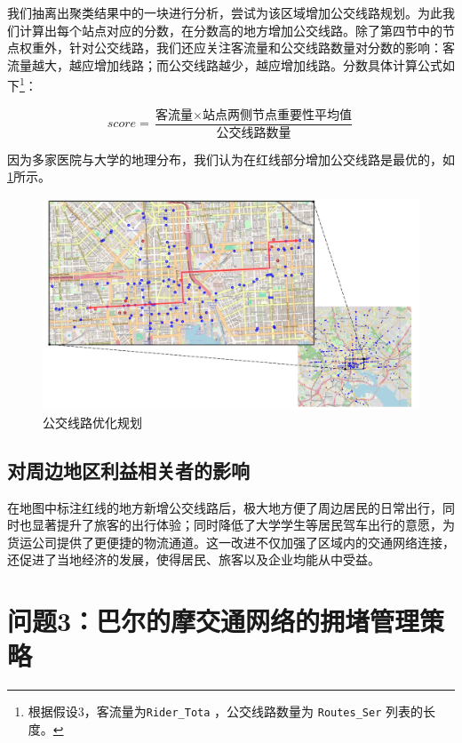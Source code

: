 \documentclass[12pt, a4paper, oneside]{ctexart}
\begin{document}
我们抽离出聚类结果中的一块进行分析，尝试为该区域增加公交线路规划。为此我们计算出每个站点对应的分数，在分数高的地方增加公交线路。除了第四节中的节点权重外，针对公交线路，我们还应关注客流量和公交线路数量对分数的影响：客流量越大，越应增加线路；而公交线路越少，越应增加线路。分数具体计算公式如下\footnote{根据假设3，客流量为\texttt{Rider\_Tota} ，公交线路数量为 \texttt{Routes\_Ser} 列表的长度。}：

\begin{equation}
score=\dfrac{\text{客流量}\times \text{站点两侧节点重要性平均值}}{\text{公交线路数量}}
\end{equation}

因为多家医院与大学的地理分布，我们认为在红线部分增加公交线路是最优的，如\ref{fig:busroute}所示。

\begin{figure}[H]
  \centering
  \includegraphics[width=\textwidth]{figures/busroute.pdf}
  \caption{公交线路优化规划}
  \label{fig:busroute}
\end{figure}

\subsection{对周边地区利益相关者的影响}

在地图中标注红线的地方新增公交线路后，极大地方便了周边居民的日常出行，同时也显著提升了旅客的出行体验；同时降低了大学学生等居民驾车出行的意愿，为货运公司提供了更便捷的物流通道。这一改进不仅加强了区域内的交通网络连接，还促进了当地经济的发展，使得居民、旅客以及企业均能从中受益。

\section{问题3：巴尔的摩交通网络的拥堵管理策略}
\end{document}
